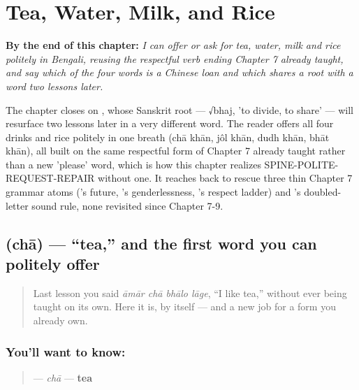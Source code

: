 
\chapter{Tea, Water, Milk, and Rice}
\label{ch:bn-tea-water-milk-rice}

\begin{chapteropening}
\textbf{By the end of this chapter:} \emph{I can offer or ask for tea, water, milk and rice politely in Bengali, reusing the respectful verb ending Chapter 7 already taught, and say which of the four words is a Chinese loan and which shares a root with a word two lessons later.}

The chapter closes on , whose Sanskrit root — √bhaj, 'to divide, to share' — will resurface two lessons later in a very different word. The reader offers all four drinks and rice politely in one breath (chā khān, jôl khān, dudh khān, bhāt khān), all built on the same respectful form of  Chapter 7 already taught rather than a new 'please' word, which is how this chapter realizes SPINE-POLITE-REQUEST-REPAIR without one. It reaches back to rescue three thin Chapter 7 grammar atoms ('s future, 's genderlessness, 's respect ladder) and 's doubled-letter sound rule, none revisited since Chapter 7-9.
\end{chapteropening}

\section[chā]{ (chā) — \textquotedblleft{}tea,\textquotedblright{} and the first word you can politely offer}

\label{lesson:BN-C10-cha}



\begin{quote}
Last lesson you said \emph{āmār chā bhālo lāge}, \textquotedblleft{}I like tea,\textquotedblright{} without  ever being taught on its own. Here it is, by itself — and a new job for a form you already own.
\end{quote}

\subsection*{You'll want to know: }
\begin{quote}
\textbf{} — \emph{chā} — \textbf{tea}
\end{quote}

